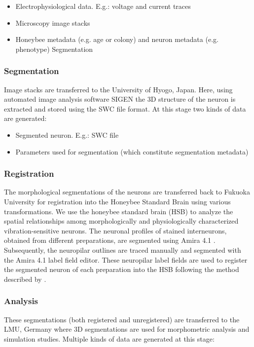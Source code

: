 \documentclass{frontiersSCNS} %
\begin{document}
\begin{itemize}
\item Electrophysiological data. E.g.: voltage and current traces
\item Microscopy image stacks
\item Honeybee metadata (e.g. age or colony) and neuron metadata (e.g. phenotype) Segmentation
\end{itemize}

\subsubsection{Segmentation}

Image stacks are transferred to the University of Hyogo, Japan. Here, using
automated image analysis software SIGEN \citep{Yamasaki2006, Minemoto} the 3D structure of the neuron is extracted and stored using the
SWC file format. At this stage two kinds of data are generated:

\begin{itemize}
\item Segmented neuron. E.g.: SWC file
\item Parameters used for segmentation (which constitute segmentation metadata)
\end{itemize}


\subsubsection{Registration}

The morphological segmentations of the neurons are transferred back to Fukuoka
University for registration into the Honeybee Standard Brain using various
transformations. We use the honeybee standard brain (HSB) to analyze the
spatial relationships among morphologically and physiologically characterized
vibration-sensitive neurons. The neuronal profiles of stained interneurons,
obtained from different preparations, are segmented  using Amira 4.1
\citep{Evers2005}. Subsequently, the neuropilar outlines are traced manually and
segmented with the Amira 4.1 label field editor. These neuropilar label fields
are used to register the segmented neuron of each preparation into the HSB
following the method described by \citet{Brandt2005}.


\subsubsection{Analysis}

These segmentations  (both registered and unregistered) are transferred to the
LMU, Germany where 3D segmentations are used for morphometric analysis and
simulation studies. Multiple kinds of data are generated at this
stage:
\end{document}
